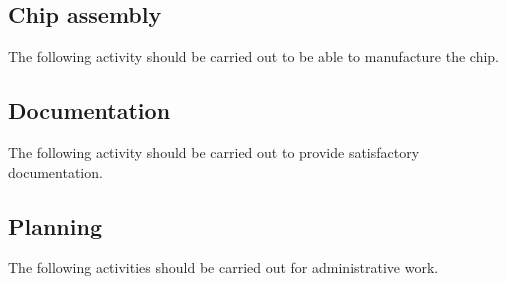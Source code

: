 \subsection{Chip assembly}
The following activity should be carried out to be able to manufacture the chip.
\begin{LIPSaktivitetslista}
\end{LIPSaktivitetslista}

\subsection{Documentation}
The following activity should be carried out to provide satisfactory documentation.
\begin{LIPSaktivitetslista}
\end{LIPSaktivitetslista}

\subsection{Planning}
The following activities should be carried out for administrative work.
\begin{LIPSaktivitetslista}
\end{LIPSaktivitetslista}


